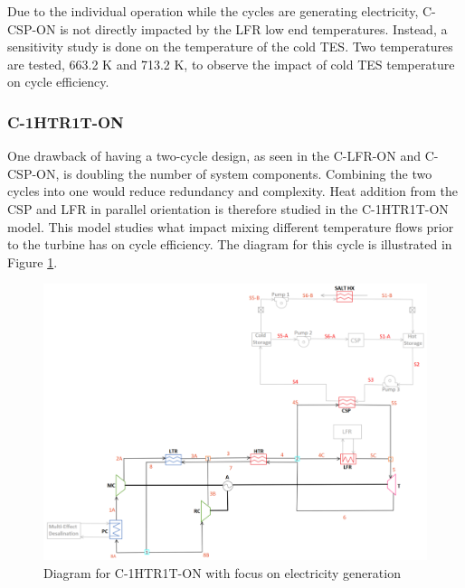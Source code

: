 \begin{paracol}{2}
\linenumbers
\switchcolumn

 Due to the individual operation while the cycles are generating electricity, C-CSP-ON is not directly impacted by the LFR low end temperatures. Instead, a sensitivity study is done on the temperature of the cold TES. Two temperatures are tested, 663.2 K and 713.2 K, to observe the impact of cold TES temperature on cycle efficiency. 


\subsubsection{C-1HTR1T-ON} %

One drawback of having a two-cycle design, as seen in the C-LFR-ON and C-CSP-ON, is doubling the number of system components. Combining the two cycles into one would reduce redundancy and complexity. Heat addition from the CSP and LFR in parallel orientation is therefore studied in the C-1HTR1T-ON model. This model studies what impact mixing different temperature flows prior to the turbine has on cycle efficiency. The diagram for this cycle is illustrated in Figure \ref{c-1htr1t-on}.


\end{paracol}
\begin{figure}[H] 
    \widefigure
    \includegraphics[width=\linewidth]{Definitions/c-1htr1t-on.pdf}
    \caption{Diagram for C-1HTR1T-ON with focus on electricity generation\label{c-1htr1t-on}}
\end{figure}
